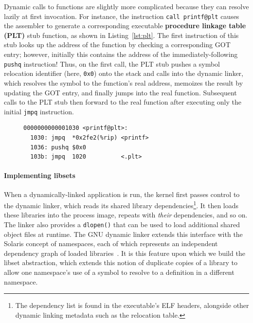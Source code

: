 Dynamic calls to functions are slightly more complicated because they can resolve
lazily at first invocation.  For instance, the instruction
\texttt{call~printf@plt} causes the assembler to generate a corresponding executable
\textbf{procedure linkage table (PLT)} stub function, as shown in
Listing~\ref{lst:plt}.  The first instruction of this stub looks up the address of
the
function by checking a corresponding GOT entry; however, initially this contains the
address of the immediately-following \texttt{pushq} instruction!  Thus, on the first
call, the PLT stub pushes a symbol relocation identifier (here, \texttt{0x0}) onto
the stack and calls into the dynamic linker, which resolves the symbol to the
function's real address, memoizes the result by updating the GOT entry, and finally
jumps into the real function.  Subsequent calls to the PLT stub then forward to the
real function after executing only the initial \texttt{jmpq} instruction.

\begin{figure}
\begin{lstlisting}[label=lst:plt,caption=Example PLT entry for call to \texttt{printf()}]
0000000000001030 <printf@plt>:
  1030: jmpq  *0x2fe2(%rip) <printf>
  1036: pushq $0x0
  103b: jmpq  1020          <.plt>
\end{lstlisting}
\end{figure}

\paragraph{Implementing libsets}

When a dynamically-linked application is run, the kernel first passes control to the
dynamic linker, which reads its shared library dependencies\footnote{The dependency
list is found in the executable's ELF headers, alongside other dynamic linking
metadata such as the relocation table.}.  It then loads these libraries into the
process image, repeats with
\textit{their} dependencies, and so on.  The linker also provides a \texttt{dlopen()}
that can be used to load additional shared object files at runtime.  The GNU dynamic
linker extends this interface with the Solaris concept of namespaces, each of which
represents an independent dependency graph of loaded
libraries~\cite{dlmopen-manpage}.  It is this feature upon which we build the libset
abstraction, which extends this notion of duplicate copies of a library to allow one
namespace's use of a symbol to resolve to a definition in a different namespace.

